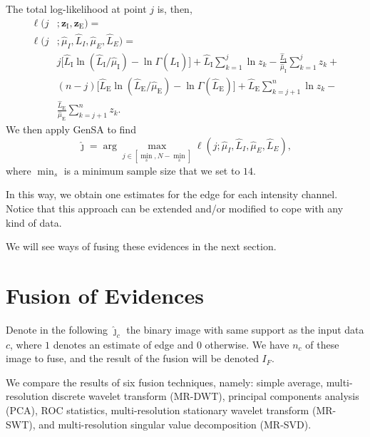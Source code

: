 \documentclass[journal]{IEEEtran}
\begin{document}
The total log-likelihood at point $j$ is, then,
\begin{equation}\label{eq:TotalLogLikelihood}
\begin{split}
\ell(j&;\bm z_\text{I},\bm z_\text{E}) = \\
\ell(j&;\widehat{\mu}_I, \widehat{L}_I,\widehat{\mu}_E, \widehat{L}_E)=\\
&j \big[\widehat{L}_\text{I}\ln (\widehat{L}_\text{I} / \widehat{\mu}_\text{I}) - \ln \Gamma(\widehat{L}_\text{I})\big]
+\widehat{L}_\text{I} \sum_{k=1}^{j}\ln z_k -\frac{\widehat{L}_\text{I}}{\widehat{\mu}_\text{I}}\sum_{k=1}^{j} z_k +\\
&(n-j) \big[\widehat{L}_\text{E}\ln (\widehat{L}_\text{E} / \widehat{\mu}_\text{E}) - \ln \Gamma(\widehat{L}_\text{E})\big]
+\widehat{L}_\text{E} \sum_{k=j+1}^{n}\ln z_k -\\ &\frac{\widehat{L}_\text{E}}{\widehat{\mu}_\text{E}}\sum_{k=j+1}^{n} z_k.
\end{split}
\end{equation}
We then apply GenSA to find  
$$
\widehat{\jmath}= \arg\max\limits_{j\in [\min_s,N-\min_s]}\ell(j;\widehat{\mu}_I, \widehat{L}_I,\widehat{\mu}_E, \widehat{L}_E),
$$ 
where $\min_s$ is a minimum sample size that we set to $14$.

In this way, we obtain one estimates for the edge for each intensity channel.
Notice that this approach can be extended and/or modified to cope with any kind of data.

We will see ways of fusing these evidences in the next section.

\section{Fusion of Evidences}\label{sec_04}

Denote in the following $\widehat{\bm\jmath}_c$ the binary image with same support as the input data $c$, where $1$ denotes an estimate of edge and $0$ otherwise.
We have $n_c$ of these image to fuse, and the result of the fusion will be denoted $I_F$.

We compare the results of six fusion techniques, namely:
simple average, 
multi-resolution discrete wavelet transform (MR-DWT),
principal components analysis (PCA), 
ROC statistics,
multi-resolution stationary wavelet transform (MR-SWT), and
multi-resolution singular value decomposition (MR-SVD).

\end{document}
